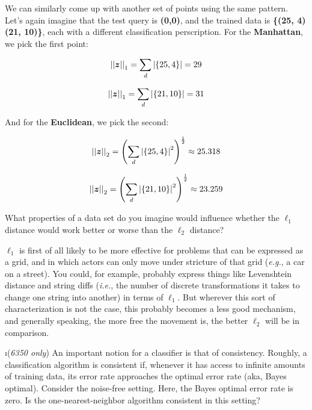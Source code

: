 \documentclass[fleqn]{article}
\begin{document}
\begin{solution}
We can similarly come up with another set of points using the same pattern. Let's again imagine that the test query is \textbf{(0,0)}, and the trained data is \textbf{\{(25, 4) (21, 10)\}}, each with a different classification perscription. For the \textbf{Manhattan}, we pick the first point:

\begin{equation}
\left\vert\left\vert \boldsymbol{z} \right\vert\right\vert_1 = \sum_d \left\vert \{25, 4\} \right\vert = 29
\end{equation}

\begin{equation}
\left\vert\left\vert \boldsymbol{z} \right\vert\right\vert_1 = \sum_d \left\vert \{21, 10\} \right\vert = 31
\end{equation}

And for the \textbf{Euclidean}, we pick the second:

\begin{equation}
\left\vert\left\vert \boldsymbol{z} \right\vert\right\vert_2 = \left(\sum_d \left\vert \{25, 4\} \right\vert^2\right)^{\frac 1 2} \approx 25.318
\end{equation}

\begin{equation}
\left\vert\left\vert \boldsymbol{z} \right\vert\right\vert_2 = \left(\sum_d \left\vert \{21, 10\} \right\vert^2\right)^{\frac 1 2} \approx 23.259
\end{equation}

\end{solution}

What properties of a data set do you imagine would influence whether
the $\ell_1$ distance would work better or worse than the $\ell_2$
distance?

\begin{solution}
$\ell_1$ is first of all likely to be more effective for problems that can be expressed as a grid, and in which actors can only move under stricture of that grid (\textit{e.g.}, a car on a street). You could, for example, probably express things like Levenshtein distance and string diffs (\textit{i.e.}, the number of discrete transformations it takes to change one string into another) in terms of $\ell_1$. But wherever this sort of characterization is not the case, this probably becomes a less good mechanism, and generally speaking, the more free the movement is, the better $\ell_2$ will be in comparison.
\end{solution}

\i (\textit{6350 only}) An important notion for a classifier is that 
of consistency. Roughly, a classification algorithm is consistent if, 
whenever it has access to infinite amounts of training data, its error rate
approaches the optimal error rate (aka, Bayes optimal). Consider the 
noise-free setting. Here, the Bayes optimal error rate is zero. Is the 
one-nearest-neighbor algorithm consistent in this setting?
\end{document}
